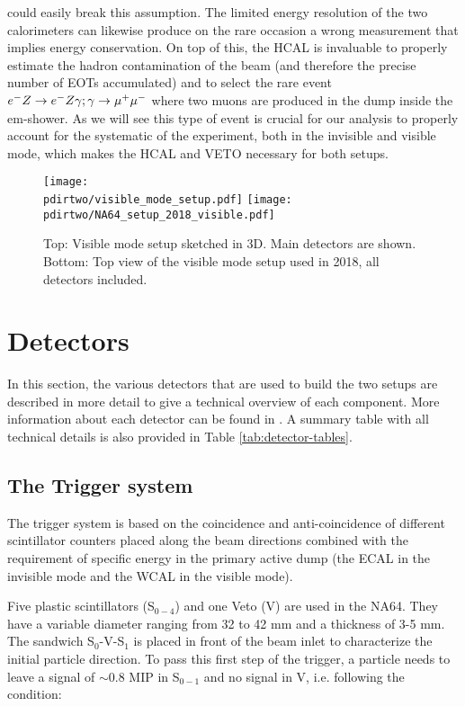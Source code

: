 could easily break this assumption. The limited energy resolution of the two calorimeters can likewise produce on the rare occasion a wrong measurement that implies energy conservation. On top of this, the HCAL is invaluable to properly estimate the hadron contamination of the beam (and therefore the precise number of EOTs accumulated) and to select the rare event $e^- Z \to e^- Z \gamma; \gamma \to \mu^+ \mu^-$ where two muons are produced in the dump inside the em-shower. As we will see this type of event is crucial for our analysis to properly account for the systematic of the experiment, both in the invisible and visible mode, which makes the HCAL and VETO necessary for both setups.

\begin{figure}[tb]
  \centering
  \texttt{[image: \\pdirtwo/visible\_mode\_setup.pdf]}  
  \texttt{[image: \\pdirtwo/NA64\_setup\_2018\_visible.pdf]}
  \caption[NA64 visible mode setup 2018]{Top: Visible mode setup sketched in 3D. Main detectors are shown. Bottom: Top view of the visible mode setup used in 2018, all detectors included.}
  \label{fig:setup-vis-2018}
\end{figure}

\section{Detectors}
\label{ch2:sec:detectors}

In this section, the various detectors that are used to build the two setups are described in more detail to give a technical overview of each component. More information about each detector can be found in \cite{na64-hcal,na64-detectors,ABBON201569}. A summary table with all technical details is also provided in Table \ref{tab:detector-tables}.

\subsection{The Trigger system}
\label{ch2:sec:detectors-trigger}

The trigger system is based on the coincidence and anti-coincidence of different scintillator counters placed along the beam directions combined with the requirement of specific energy in the primary active dump (the ECAL in the invisible mode and the WCAL in the visible mode).

Five plastic scintillators (S$_{0-4}$) and one Veto (V) are used in the NA64. They have a variable diameter ranging from 32 to 42 \si{mm} and a thickness of 3-5 \si{mm}. The sandwich S$_0$-V-S$_1$ is placed in front of the beam inlet to characterize the initial particle direction. To pass this first step of the trigger, a particle needs to leave a signal of $\sim$0.8 MIP in S$_{0-1}$ and no signal in V, i.e. following the condition:


